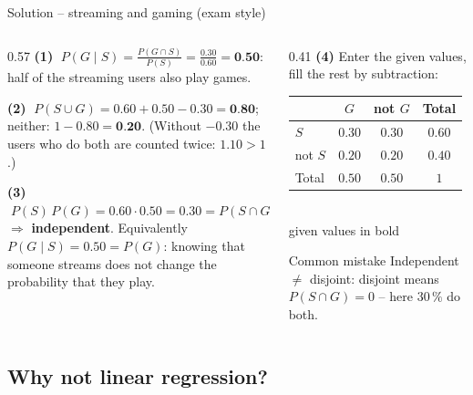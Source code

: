 \documentclass[aspectratio=169,11pt]{beamer}
\begin{document}
\begin{frame}{Solution -- streaming and gaming (exam style)}
  \begin{columns}[T]
    \begin{column}{0.57\textwidth}
      \textbf{(1)} $\;P(G\mid S)=\frac{P(G\cap S)}{P(S)}=\frac{0.30}{0.60}=\textbf{0.50}$:
      half of the streaming users also play games.

      \medskip
      \textbf{(2)} $\;P(S\cup G)=0.60+0.50-0.30=\textbf{0.80}$;\\
      neither: $1-0.80=\textbf{0.20}$. (Without $-0.30$ the users who do
      both are counted twice: $1.10>1$.)

      \medskip
      \textbf{(3)} $\;P(S)\,P(G)=0.60\cdot0.50=0.30=P(S\cap G)$\\
      $\Rightarrow$ \textbf{independent}. Equivalently
      $P(G\mid S)=0.50=P(G)$: knowing that someone streams does not change
      the probability that they play.
    \end{column}
    \begin{column}{0.41\textwidth}
      \textbf{(4)} Enter the given values, fill the rest by subtraction:
      \begin{center}
        \renewcommand{\arraystretch}{1.15}
        \begin{tabular}{@{}l|cc|c@{}}
          \toprule
          & $G$ & not $G$ & Total\\
          \midrule
          $S$ & $\mathbf{0.30}$ & $0.30$ & $\mathbf{0.60}$\\
          not $S$ & $0.20$ & $0.20$ & $0.40$\\
          \midrule
          Total & $\mathbf{0.50}$ & $0.50$ & $1$\\
          \bottomrule
        \end{tabular}\\[1pt]
        {\footnotesize given values in bold}
      \end{center}
      \begin{alertblock}{Common mistake}
        Independent $\neq$ disjoint: disjoint means $P(S\cap G)=0$ -- here
        $30\,\%$ do both.
      \end{alertblock}
    \end{column}
  \end{columns}
\end{frame}

\subsection{Why not linear regression?}
\end{document}
